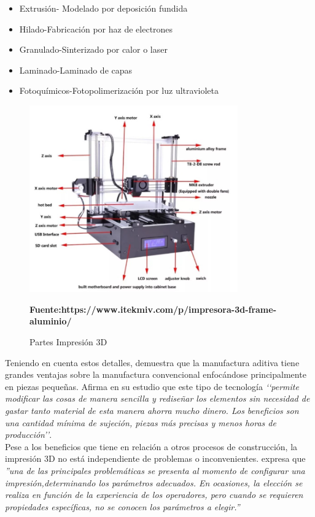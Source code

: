 \begin{itemize}
  \item Extrusión- Modelado por deposición fundida
  \item Hilado-Fabricación por haz de electrones
  \item Granulado-Sinterizado por calor o laser
  \item Laminado-Laminado de capas
  \item Fotoquímicos-Fotopolimerización por luz ultravioleta
\end{itemize}

\begin{figure}[H]
    \centering
    \includegraphics[width=0.8\textwidth]{Figs/partes.PNG}
    \caption{Partes Impresión 3D}
    \textbf{Fuente:\:https://www.itekmiv.com/p/impresora-3d-frame-aluminio/}
     \label{fig:IMP3D}
\end{figure}

Teniendo en cuenta estos detalles, \citep{muller} demuestra que la manufactura aditiva tiene grandes ventajas sobre la manufactura convencional enfocándose principalmente en piezas pequeñas.  Afirma en su estudio que este tipo de tecnología \textit{‘‘permite modificar las cosas de manera sencilla y rediseñar los elementos sin necesidad de gastar tanto material de esta manera ahorra mucho dinero. Los beneficios son una cantidad mínima de sujeción, piezas más precisas y menos horas de producción’’}.  \\


Pese a los beneficios que tiene en relación a otros procesos de construcción, la impresión 3D no está independiente de problemas o inconvenientes.\citep{alvarez} expresa que \textit{''una de las principales problemáticas se presenta al momento de configurar una impresión,determinando los parámetros adecuados. En ocasiones, la elección se realiza en función de la experiencia de los operadores, pero cuando se requieren propiedades específicas, no se conocen los parámetros a elegir.''} \\

